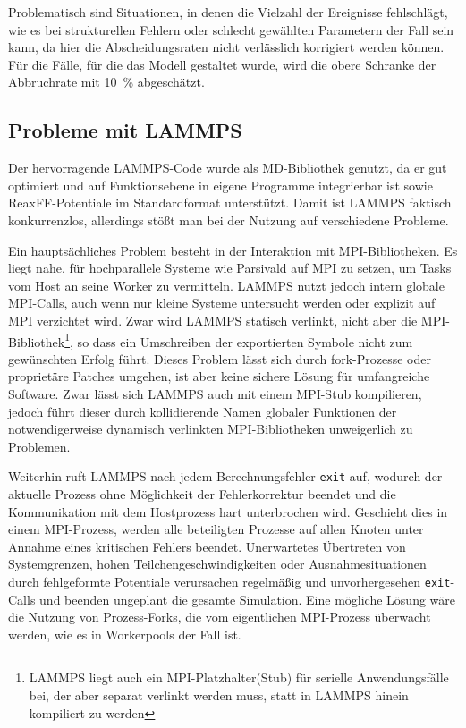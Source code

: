 Problematisch sind Situationen, in denen die Vielzahl der Ereignisse fehlschlägt, wie es bei strukturellen Fehlern oder schlecht gewählten Parametern der Fall sein kann, da hier die Abscheidungsraten nicht verlässlich korrigiert werden können.
Für die Fälle, für die das Modell gestaltet wurde, wird die obere Schranke der Abbruchrate mit \SI{10}{\percent} abgeschätzt.

\subsection{Probleme mit LAMMPS}
\label{lammpssucks}

Der hervorragende LAMMPS-Code wurde als MD-Bibliothek genutzt, da er gut optimiert und auf Funktionsebene in eigene Programme integrierbar ist sowie ReaxFF-Potentiale im Standardformat unterstützt.
Damit ist LAMMPS faktisch konkurrenzlos, allerdings stößt man bei der Nutzung auf verschiedene Probleme.

Ein hauptsächliches Problem besteht in der Interaktion mit MPI-Bibliotheken.
Es liegt nahe, für hochparallele Systeme wie Parsivald auf MPI zu setzen, um Tasks vom Host an seine Worker zu vermitteln.
LAMMPS nutzt jedoch intern globale MPI-Calls, auch wenn nur kleine Systeme untersucht werden oder explizit auf MPI verzichtet wird.
Zwar wird LAMMPS statisch verlinkt, nicht aber die MPI-Bibliothek\footnote{LAMMPS liegt auch ein MPI-Platzhalter(Stub) für serielle Anwendungsfälle bei, der aber separat verlinkt werden muss, statt in LAMMPS hinein kompiliert zu werden}, so dass ein Umschreiben der exportierten Symbole nicht zum gewünschten Erfolg führt.
Dieses Problem lässt sich durch fork-Prozesse oder proprietäre Patches umgehen, ist aber keine sichere Lösung für umfangreiche Software.
Zwar lässt sich LAMMPS auch mit einem MPI-Stub kompilieren, jedoch führt dieser durch kollidierende Namen globaler Funktionen der notwendigerweise dynamisch verlinkten MPI-Bibliotheken unweigerlich zu Problemen.

Weiterhin ruft LAMMPS nach jedem Berechnungsfehler \texttt{exit} auf, wodurch der aktuelle Prozess ohne Möglichkeit der Fehlerkorrektur beendet und die Kommunikation mit dem Hostprozess hart unterbrochen wird.
Geschieht dies in einem MPI-Prozess, werden alle beteiligten Prozesse auf allen Knoten unter Annahme eines kritischen Fehlers beendet.
Unerwartetes Übertreten von Systemgrenzen, hohen Teilchengeschwindigkeiten oder Ausnahmesituationen durch fehlgeformte Potentiale verursachen regelmäßig und unvorhergesehen \texttt{exit}-Calls und beenden ungeplant die gesamte Simulation.
Eine mögliche Lösung wäre die Nutzung von Prozess-Forks, die vom eigentlichen MPI-Prozess überwacht werden, wie es in Workerpools der Fall ist.

